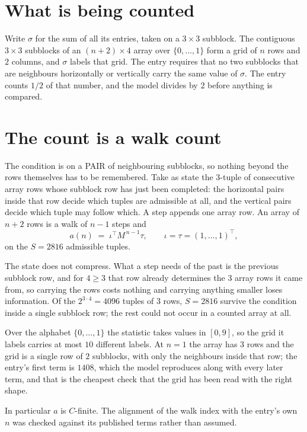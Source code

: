 \documentclass[11pt,a4paper]{article}
\theoremstyle{plain}
\theoremstyle{definition}
\begin{document}
\section{What is being counted}

Write $\sigma$ for the sum of all its entries, taken on a $3\times3$ subblock. The contiguous $3\times3$
subblocks of an $(n+2)\times4$ array over $\{0,\dots,1\}$ form a grid of $n$ rows
and $2$ columns, and $\sigma$ labels that grid. The entry
requires that no two subblocks that are neighbours horizontally or vertically carry the same value of $\sigma$. The entry counts $1/2$ of that number, and the model divides by $2$ before anything is compared.

\section{The count is a walk count}

The condition is on a PAIR of neighbouring subblocks, so nothing beyond the
rows themselves has to be remembered. Take as state the $3$-tuple of consecutive array rows
whose subblock row has just been completed: the horizontal pairs inside that row decide which
tuples are admissible at all, and the vertical pairs decide which tuple may follow which. A
step appends one array row. An array of $n+2$ rows is a walk of $n-1$ steps and
\[
a(n)\;=\;\iota^{\!\top}M^{\,n-1}\tau,\qquad\iota=\tau=(1,\dots,1)^{\!\top},
\]
on the $S=2816$ admissible tuples.

The state does not compress. What a step needs of the past is the previous subblock row, and
for $4\ge3$ that row already determines the $3$ array rows it came from, so carrying the
rows costs nothing and carrying anything smaller loses information. Of the $2^{3\cdot
4}=4096$ tuples of $3$ rows, $S=2816$ survive the condition inside a single subblock row;
the rest could not occur in a counted array at all.

Over the alphabet $\{0,\dots,1\}$ the statistic takes values in $[0,9]$, so the
grid it labels carries at most $10$ different labels. At $n=1$ the array has $3$
rows and the grid is a single row of $2$
subblocks, with only the neighbours inside that row; the entry's first term is
$1408$, which the model reproduces along with every later term, and that is the cheapest
check that the grid has been read with the right shape.

In particular $a$ is $C$-finite. The alignment of the walk index with the entry's own $n$ was
checked against its published terms rather than assumed.
\end{document}
